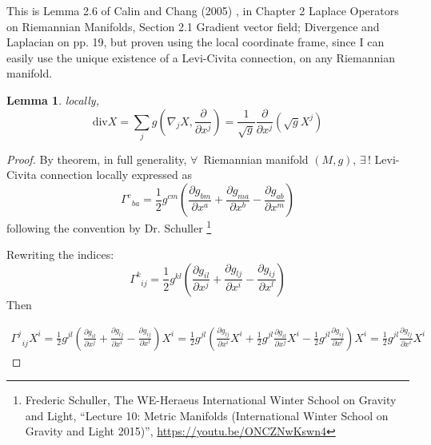 \documentclass[twoside,landscape,10pt]{amsart}
\theoremstyle{plain}
\newtheorem{lemma}{Lemma}
\theoremstyle{definition}
\theoremstyle{remark}
\theoremstyle{remark}
\begin{document}
\begin{multicols*}{2}
This is Lemma 2.6 of Calin and Chang (2005) \cite{OCalinDChang2005}, in Chapter 2 Laplace Operators on Riemannian Manifolds, Section 2.1 Gradient vector field; Divergence and Laplacian on pp. 19, but proven using the local coordinate frame, since I can easily use the unique existence of a Levi-Civita connection, on any Riemannian manifold.    
\begin{lemma}
  locally,
\begin{equation}
  \text{div}X = \sum_j g(\nabla_j X, \frac{ \partial }{ \partial x^j} ) = \frac{1}{\sqrt{g}} \frac{ \partial }{ \partial x^j} (\sqrt{g} X^j )
\end{equation}
\end{lemma}

\begin{proof}
  By theorem, in full generality, $\forall \, $ Riemannian manifold $(M,g)$, $\exists \, !$ Levi-Civita connection locally expressed as 
\[
\Gamma^c_{ \; \; ba } = \frac{1}{2} g^{cm} \left( \frac{ \partial g_{bm}}{ \partial x^a } + \frac{ \partial g_{ma}}{ \partial x^b} - \frac{ \partial g_{ab}}{ \partial x^m} \right)
\]
following the convention by Dr. Schuller \footnote{Frederic Schuller, The WE-Heraeus International Winter School on Gravity and Light, ``Lecture 10: Metric Manifolds (International Winter School on Gravity and Light 2015)'', \url{https://youtu.be/ONCZNwKswn4}}

Rewriting the indices:
\[
\Gamma^k_{ \; \; ij } = \frac{1}{2} g^{kl} \left( \frac{ \partial g_{il}}{ \partial x^j } + \frac{ \partial g_{lj}}{ \partial x^i} - \frac{ \partial g_{ij}}{ \partial x^l} \right)
\]
Then

\[
\begin{gathered}
\Gamma^j_{ \; \; ij }X^i =  \frac{1}{2} g^{jl} \left( \frac{ \partial g_{il}}{ \partial x^j } + \frac{ \partial g_{lj}}{ \partial x^i} - \frac{ \partial g_{ij}}{ \partial x^l} \right) X^i =  \frac{1}{2} g^{jl} \left( \frac{ \partial g_{lj}}{ \partial x^i }X^i + \frac{1}{2} g^{jl}\frac{ \partial g_{il}}{ \partial x^j}X^i - \frac{1}{2}g^{jl} \frac{ \partial g_{ij}}{ \partial x^l} \right) X^i = \frac{1}{2} g^{jl} \frac{ \partial g_{lj} }{ \partial x^i} X^i
\end{gathered}
\]



\end{proof}
\end{multicols*}
\end{document}

